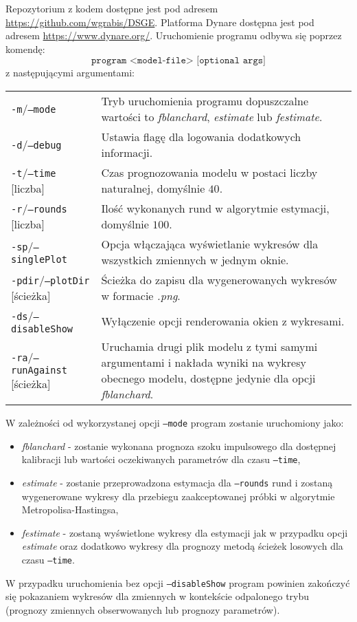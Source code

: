 Repozytorium z kodem dostępne jest pod adresem \url{https://github.com/wgrabis/DSGE}. Platforma Dynare dostępna jest pod adresem \url{https://www.dynare.org/}. Uruchomienie programu odbywa się poprzez komendę:
\begin{equation}
    \texttt{program <model-file> [optional args]} \nonumber
\end{equation}
z następującymi argumentami:
\begin{center}
    \begin{tabular}{p{}p{}}
          \texttt{-m}/\texttt{--mode} & Tryb uruchomienia programu dopuszczalne wartości to \emph{fblanchard}, \emph{estimate} lub \emph{festimate}. \\
         \texttt{-d}/\texttt{--debug} & Ustawia flagę dla logowania dodatkowych informacji.\\
         \texttt{-t}/\texttt{--time} [liczba] & Czas prognozowania modelu w postaci liczby naturalnej, domyślnie $40$. \\
         \texttt{-r}/\texttt{--rounds} [liczba] & Ilość wykonanych rund w algorytmie estymacji, domyślnie $100$. \\
         \texttt{-sp}/\texttt{--singlePlot} & Opcja włączająca wyświetlanie wykresów dla wszystkich zmiennych w jednym oknie. \\
         \texttt{-pdir}/\texttt{--plotDir} [ścieżka] & Ścieżka do zapisu dla wygenerowanych wykresów w formacie \emph{.png}. \\
         \texttt{-ds}/\texttt{--disableShow}  & Wyłączenie opcji renderowania okien z wykresami. \\
         \texttt{-ra}/\texttt{--runAgainst} [ścieżka]  & Uruchamia drugi plik modelu z tymi samymi argumentami i nakłada wyniki na wykresy obecnego modelu, dostępne jedynie dla opcji \emph{fblanchard}.  \\
    \end{tabular}
\end{center}
W zależności od wykorzystanej opcji \texttt{--mode} program zostanie uruchomiony jako:
\begin{itemize}
    \item \emph{fblanchard} - zostanie wykonana prognoza szoku impulsowego dla dostępnej kalibracji lub wartości oczekiwanych parametrów dla czasu \texttt{--time},
    \item \emph{estimate} - zostanie przeprowadzona estymacja dla \texttt{--rounds} rund i zostaną wygenerowane wykresy dla przebiegu zaakceptowanej próbki w algorytmie Metropolisa-Hastingsa,
    \item \emph{festimate} - zostaną wyświetlone wykresy dla estymacji jak w przypadku opcji \emph{estimate} oraz dodatkowo wykresy dla prognozy metodą ścieżek losowych dla czasu \texttt{--time}.
\end{itemize}
W przypadku uruchomienia bez opcji \texttt{--disableShow} program powinien zakończyć się pokazaniem wykresów dla zmiennych w kontekście odpalonego trybu (prognozy zmiennych obserwowanych lub prognozy parametrów).


